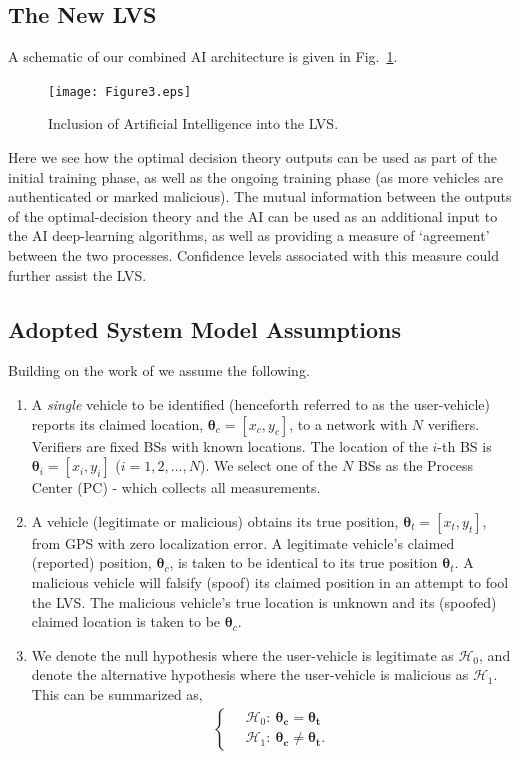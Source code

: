 \documentclass[journal]{IEEEtran}
\newcommand{\Hnull}{\mathcal{H}_0}
\newcommand{\Halt}{\mathcal{H}_1}
\begin{document}
\subsection{The New LVS}
A schematic of our combined AI architecture is given in Fig.~\ref{Figure3}.
\begin{figure}[t!]
\centering
\texttt{[image: Figure3.eps]}
\caption{Inclusion of Artificial Intelligence into the LVS.\label{Figure3}}
\end{figure}
Here we see how the optimal decision theory outputs can be used as part of the initial training phase, as well as the ongoing training phase (as more vehicles are authenticated or marked malicious). The mutual information between the outputs of the optimal-decision theory and the AI can be used as an additional input to the AI deep-learning algorithms, as well as providing a measure of `agreement' between the two processes. Confidence levels associated with this measure could further assist the LVS.
\subsection{Adopted System Model Assumptions}
Building on the work of \cite{Ausctw} we assume the following.

\begin{enumerate}

\item {A \emph{single} vehicle to be identified (henceforth referred to as the user-vehicle) reports its claimed location, $\bm{\theta}_c = [x_c,y_c]$, to a network with $N$ verifiers. Verifiers are fixed BSs with known locations. The location of the $i$-th BS is $\bm{\theta}_i = [x_{i},y_{i}]$ ($i = 1, 2, \dots, N$). We select one of the $N$ BSs as the Process Center (PC) - which collects all measurements.}

\item {A vehicle (legitimate or malicious)  obtains its true position, $\bm{\theta}_t = [x_t,y_t]$, from  GPS with zero localization error. A legitimate vehicle's claimed (reported) position, $\bm{\theta}_c$, is taken to be identical to its true position $\bm{\theta}_t$. A malicious vehicle will falsify (spoof) its claimed position in an attempt to fool the LVS. The malicious vehicle's true location is unknown and its (spoofed) claimed  location is  taken to be $\bm{\theta}_c$.}

\item {We denote the null hypothesis where the user-vehicle is legitimate as $\Hnull$, and denote the alternative hypothesis where the user-vehicle is malicious as $\Halt$. This can be summarized as,
\begin{eqnarray}\label{prior}
 \left\{ \begin{aligned}\label{ncon}
        \ & \Hnull:~\bm{\theta_c} = \bm{\theta_t}\\
        \ & \Halt:~\bm{\theta_c} \neq \bm{\theta_t}.
         \end{aligned} \right.
\end{eqnarray}}
\end{enumerate}
\end{document}
